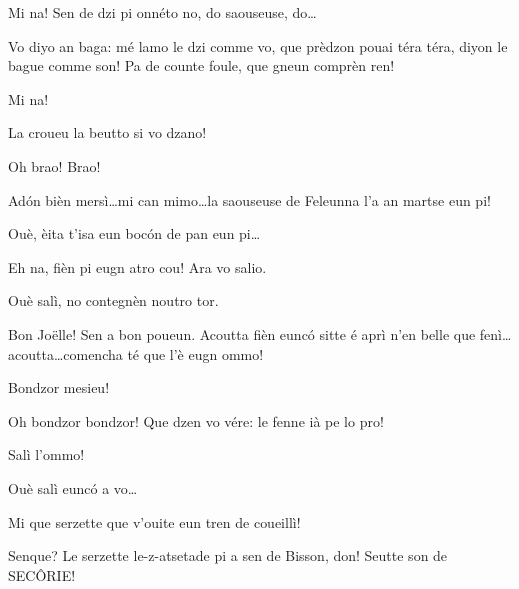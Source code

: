\begin{drama}
\Cimaspeaks Mi na! Sen de dzi pi onnéto no, do saouseuse, do\ldots

\Jeanspeaks  Vo diyo an baga: mé lamo le dzi comme vo, que prè\-dzon pouai téra téra, diyon le bague comme son! Pa de counte foule, que gneun comprèn ren!

\Cimaspeaks Mi na! 

\Jeanspeaks La croueu la beutto si vo dzano!

\CimaMarcospeaks Oh brao! Brao!

\Cimaspeaks Ad\'on bièn mersì\ldots mi can mimo\ldots la saouseuse de Feleunna l'a an martse eun pi!

\Jeanspeaks Ouè, èita t'isa eun boc\'on de pan eun pi\ldots

\Cimaspeaks Eh na, fièn pi eugn atro cou! Ara vo salio.

\Marcospeaks Ouè  salì, no contegnèn noutro tor.





\Dallasspeaks Bon Jo\"{e}lle! Sen a bon poueun. Acoutta fièn eun\-c\'o sitte  é aprì n'en belle que fenì\ldots acoutta\ldots comencha té que l'è eugn ommo!


\Joellespeaks Bondzor mesieu!

\Pompiolenspeaks Oh bondzor bondzor! Que dzen vo vére: le fenne ià pe lo pro!

\Dallasspeaks Salì l'ommo!

\Pompiolenspeaks Ouè salì eunc\'o a vo\ldots

\Dallasspeaks Mi que serzette que v'ouite eun tren de coueillì!


\Pompiolenspeaks{} Senque? Le serzette le-z-atsetade pi a sen de Bisson, don! Seutte son de SEC\^ORIE!



\end{drama}
